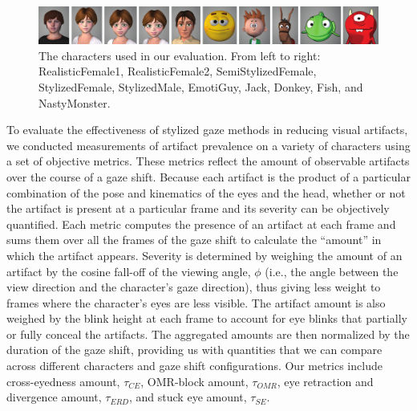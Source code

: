 \begin{figure}
\centering
\includegraphics[width=1\textwidth]{stylizedgaze/Figures/TestCases-small.pdf}
\caption{The characters used in our evaluation. From left to right: RealisticFemale1, RealisticFemale2, SemiStylizedFemale, StylizedFemale, StylizedMale, EmotiGuy, Jack, Donkey, Fish, and NastyMonster.}
\label{fig:TestCases}
\end{figure}

To evaluate the effectiveness of stylized gaze methods in reducing visual artifacts, we conducted measurements of artifact prevalence on a variety of characters using a set of objective metrics. These metrics reflect the amount of observable artifacts over the course of a gaze shift. Because each artifact is the product of a particular combination of the pose and kinematics of the eyes and the head, whether or not the artifact is present at a particular frame and its severity can be objectively quantified. Each metric computes the presence of an artifact at each frame and sums them over all the frames of the gaze shift to calculate the ``amount'' in which the artifact appears. Severity is determined by weighing the amount of an artifact by the cosine fall-off of the viewing angle, $\phi$ (i.e., the angle between the view direction and the character's gaze direction), thus giving less weight to frames where the character's eyes are less visible. The artifact amount is also weighed by the blink height at each frame to account for eye blinks that partially or fully conceal the artifacts. The aggregated amounts are then normalized by the duration of the gaze shift, providing us with quantities that we can compare across different characters and gaze shift configurations. Our metrics include cross-eyedness amount, $\tau_{CE}$, OMR-block amount, $\tau_{OMR}$, eye retraction and divergence amount, $\tau_{ERD}$, and stuck eye amount, $\tau_{SE}$.

